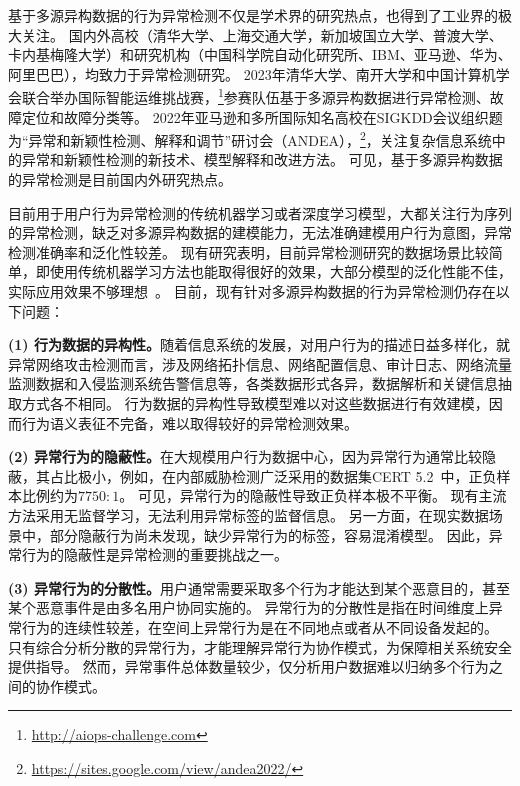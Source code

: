 基于多源异构数据的行为异常检测不仅是学术界的研究热点，也得到了工业界的极大关注。
国内外高校（清华大学、上海交通大学，新加坡国立大学、普渡大学、卡内基梅隆大学）和研究机构（中国科学院自动化研究所、IBM、亚马逊、华为、阿里巴巴），均致力于异常检测研究。
2023年清华大学、南开大学和中国计算机学会联合举办国际智能运维挑战赛，\footnote{\url{http://aiops-challenge.com}}参赛队伍基于多源异构数据进行异常检测、故障定位和故障分类等。
2022年亚马逊和多所国际知名高校在SIGKDD会议组织题为“异常和新颖性检测、解释和调节”研讨会（ANDEA），\footnote{\url{https://sites.google.com/view/andea2022/}}，关注复杂信息系统中的异常和新颖性检测的新技术、模型解释和改进方法。
可见，基于多源异构数据的异常检测是目前国内外研究热点。

目前用于用户行为异常检测的传统机器学习或者深度学习模型，大都关注行为序列的异常检测，缺乏对多源异构数据的建模能力，无法准确建模用户行为意图，异常检测准确率和泛化性较差。
现有研究表明，目前异常检测研究的数据场景比较简单，即使用传统机器学习方法也能取得很好的效果，大部分模型的泛化性能不佳，实际应用效果不够理想~\cite{Wu2020CurrentTS}。
目前，现有针对多源异构数据的行为异常检测仍存在以下问题：

\textbf{\songti (1) 行为数据的异构性。}随着信息系统的发展，对用户行为的描述日益多样化，就异常网络攻击检测而言，涉及网络拓扑信息、网络配置信息、审计日志、网络流量监测数据和入侵监测系统告警信息等，各类数据形式各异，数据解析和关键信息抽取方式各不相同。
行为数据的异构性导致模型难以对这些数据进行有效建模，因而行为语义表征不完备，难以取得较好的异常检测效果。

\textbf{\songti (2) 异常行为的隐蔽性。}在大规模用户行为数据中心，因为异常行为通常比较隐蔽，其占比极小，例如，在内部威胁检测广泛采用的数据集CERT 5.2~\cite{Glasser2013BridgingTG}中，正负样本比例约为$7750:1$。
可见，异常行为的隐蔽性导致正负样本极不平衡。
现有主流方法采用无监督学习，无法利用异常标签的监督信息。
另一方面，在现实数据场景中，部分隐蔽行为尚未发现，缺少异常行为的标签，容易混淆模型。
因此，异常行为的隐蔽性是异常检测的重要挑战之一。

\textbf{\songti (3) 异常行为的分散性。}用户通常需要采取多个行为才能达到某个恶意目的，甚至某个恶意事件是由多名用户协同实施的。
异常行为的分散性是指在时间维度上异常行为的连续性较差，在空间上异常行为是在不同地点或者从不同设备发起的。
只有综合分析分散的异常行为，才能理解异常行为协作模式，为保障相关系统安全提供指导。
然而，异常事件总体数量较少，仅分析用户数据难以归纳多个行为之间的协作模式。

